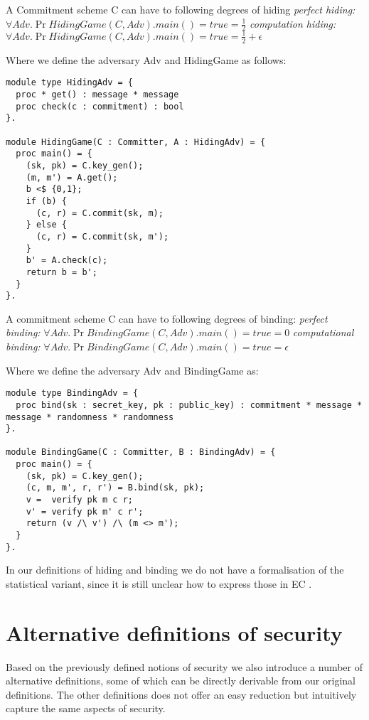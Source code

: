 \begin{definition}[Hiding]
  A Commitment scheme C can have to following degrees of hiding
  \label{def:commitment:hiding}
  \textit{perfect hiding:} $\forall Adv. \Pr{HidingGame(C,Adv).main() = true} = \frac{1}{2}$
  \textit{computation hiding:} $\forall Adv. \Pr{HidingGame(C,Adv).main() = true} = \frac{1}{2} + \epsilon$

  Where we define the adversary Adv and HidingGame as follows:
\begin{lstlisting}
module type HidingAdv = {
  proc * get() : message * message
  proc check(c : commitment) : bool
}.

module HidingGame(C : Committer, A : HidingAdv) = {
  proc main() = {
    (sk, pk) = C.key_gen();
    (m, m') = A.get();
    b <$ {0,1};
    if (b) {
      (c, r) = C.commit(sk, m);
    } else {
      (c, r) = C.commit(sk, m');
    }
    b' = A.check(c);
    return b = b';
  }
}.
\end{lstlisting}
\end{definition}

\begin{definition}[Binding]
  \label{def:commitment:binding}
  A commitment scheme C can have to following degrees of binding:
  \textit{perfect binding:} $\forall Adv. \Pr{BindingGame(C, Adv).main() = true} = 0$
  \textit{computational binding:} $\forall Adv. \Pr{BindingGame(C, Adv).main() = true} = \epsilon$

  Where we define the adversary Adv and BindingGame as:
\begin{lstlisting}
module type BindingAdv = {
  proc bind(sk : secret_key, pk : public_key) : commitment * message * message * randomness * randomness
}.

module BindingGame(C : Committer, B : BindingAdv) = {
  proc main() = {
    (sk, pk) = C.key_gen();
    (c, m, m', r, r') = B.bind(sk, pk);
    v =  verify pk m c r;
    v' = verify pk m' c r';
    return (v /\ v') /\ (m <> m');
  }
}.

\end{lstlisting}
\end{definition}

In our definitions of hiding and binding we do not have a formalisation of the
statistical variant, since it is still unclear how to express those in EC \cite{ec_intro}.


\section{Alternative definitions of security}
\label{sec:commitment:alt-sec}
Based on the previously defined notions of security we also introduce a number
of alternative definitions, some of which can be directly derivable from our
original definitions. The other definitions does not offer an easy reduction but
intuitively capture the same aspects of security.

